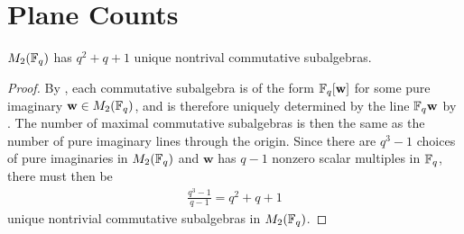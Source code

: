\documentclass{amsart}
\begin{document}



\section{Plane Counts}

\begin{theorem}\label{total-count}
    $M_2(\protect\mathbb{F}_q)$ has $q^2 + q + 1$ unique nontrival commutative subalgebras.
\end{theorem}

\begin{proof}
    By , each commutative subalgebra is of the form $\protect\mathbb{F}_q[\mathbf{w}]$ for some pure imaginary $\mathbf{w} \in M_2(\protect\mathbb{F}_q)$, and is therefore uniquely determined by the line $\protect\mathbb{F}_q \mathbf{w}$ by . The number of maximal commutative subalgebras is then the same as the number of pure imaginary lines through the origin. Since there are $q^3 -1$ choices of pure imaginaries in $M_2(\protect\mathbb{F}_q)$ and $\mathbf{w}$ has $q-1$ nonzero scalar multiples in $\protect\mathbb{F}_q$, there must then be
    \begin{align*}
        \frac{q^3 - 1}{q - 1} = q^2 + q + 1
    \end{align*}
    unique nontrivial commutative subalgebras in $M_2(\protect\mathbb{F}_q)$. 
%
%
%    
    \end{proof} 
\end{document}
